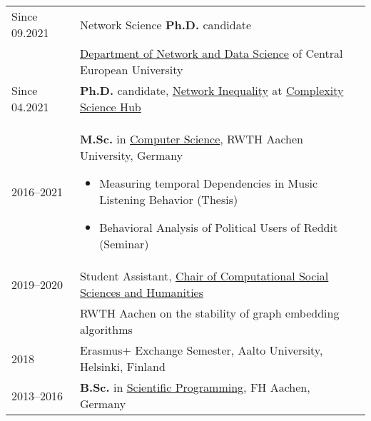 


\begin{longtable}[l]{@{}p{} p{}}
    Since 09.2021 & Network Science \textbf{Ph.D.} candidate\\
                  & \href{https://networkdatascience.ceu.edu/}{Department of Network and Data Science} of Central European University \\

    Since 04.2021 & \textbf{Ph.D.} candidate, \href{https://networkinequality.com/}{Network Inequality} at \href{https://csh.ac.at}{Complexity Science Hub} \\

    2016--2021 & \textbf{M.Sc.} in \href{https://www.informatik.rwth-aachen.de/}{Computer Science}, RWTH Aachen University, Germany\vspace{-1em}
        \begin{itemize}
            \item Measuring temporal Dependencies in Music Listening Behavior (Thesis)\vspace{-1em}
            \item Behavioral Analysis of Political Users of Reddit (Seminar)
        \end{itemize}\vspace{-2em}\\

    2019--2020 & Student Assistant, \href{https://cssh.rwth-aachen.de/}{Chair of Computational Social Sciences and Humanities}\\
               & RWTH Aachen on the stability of graph embedding algorithms~\cite{schumacher.etal_effectsrandomnessstability_2020}\\


    2018 & Erasmus+ Exchange Semester, Aalto University, Helsinki, Finland\\

    2013--2016 & \textbf{B.Sc.} in \href{https://www.fh-aachen.de/en/studies/degree-programmes/applied-mathematics-and-computer-science-dual-bsc}{Scientific Programming}, FH Aachen, Germany\\



\end{longtable}
